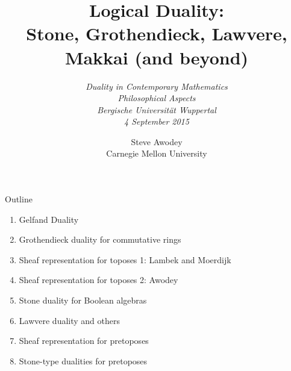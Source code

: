 \documentclass{beamer}
\begin{document}

\title{
{\sc Logical Duality:\\
  Stone, Grothendieck, Lawvere, Makkai (and beyond)}
}
\author{
\emph{Duality in Contemporary Mathematics\\
Philosophical Aspects\\
Bergische Universit\"at Wuppertal\\[2ex]
4 September 2015
}}
\date{
Steve Awodey\\
Carnegie Mellon University}

\maketitle

\begin{frame}{Outline}


\begin{enumerate}
\item Gelfand Duality

\item Grothendieck duality for commutative rings

\item Sheaf representation for toposes 1: Lambek and Moerdijk


\item Sheaf representation for toposes 2: Awodey

\item Stone duality for Boolean algebras

\item Lawvere duality and others

\item Sheaf representation for pretoposes

\item Stone-type dualities for pretoposes

\end{enumerate}

\end{frame}
\end{document}
